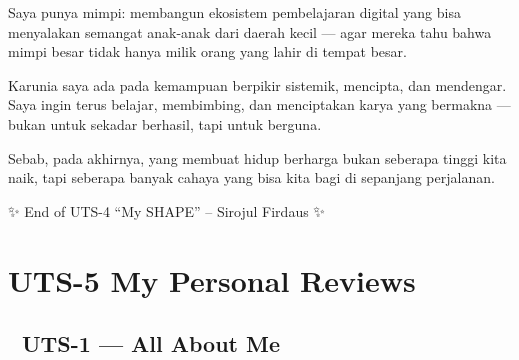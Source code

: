 \documentclass[
  letterpaper,
  DIV=11,
  numbers=noendperiod]{scrreprt}
\begin{document}
Saya punya mimpi: membangun ekosistem pembelajaran digital yang bisa
menyalakan semangat anak-anak dari daerah kecil --- agar mereka tahu
bahwa mimpi besar tidak hanya milik orang yang lahir di tempat besar.

Karunia saya ada pada kemampuan berpikir sistemik, mencipta, dan
mendengar. Saya ingin terus belajar, membimbing, dan menciptakan karya
yang bermakna --- bukan untuk sekadar berhasil, tapi untuk berguna.

Sebab, pada akhirnya, yang membuat hidup berharga bukan seberapa tinggi
kita naik, tapi seberapa banyak cahaya yang bisa kita bagi di sepanjang
perjalanan.

✨ End of UTS-4 ``My SHAPE'' -- Sirojul Firdaus ✨

\chapter{UTS-5 My Personal Reviews}\label{uts-5-my-personal-reviews}

\section{🧩 UTS-1 --- All About Me}\label{uts-1-all-about-me-1}
\end{document}

